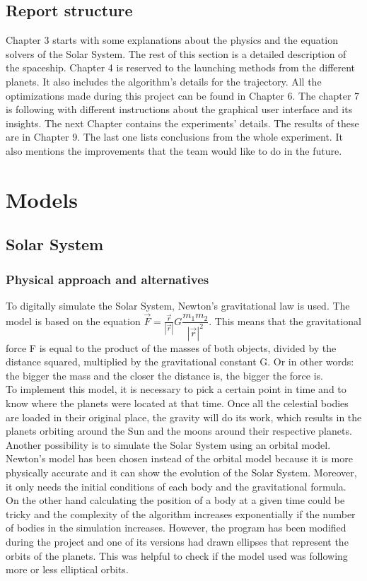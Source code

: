\documentclass[10pt,a4paper]{article}
\begin{document}
	
	
	\subsection{Report structure}
	Chapter 3 starts with some explanations about the physics and the equation solvers of the Solar System. The rest of this section is a detailed description of the spaceship. Chapter 4 is reserved to the launching methods from the different planets. It also includes the algorithm's details for the trajectory. All the optimizations made during this project can be found in Chapter 6. The chapter 7 is following with different instructions about the graphical user interface and its insights. The next Chapter contains the experiments' details. The results of these are in Chapter 9. The last one lists conclusions from the whole experiment. It also mentions the improvements that the team would like to do in the future.
	
	
	\section{Models}
	
	\subsection{Solar System}
	\subsubsection{Physical approach and alternatives}
	To digitally simulate the Solar System, Newton's gravitational law is used. The model is based on the equation $\vec{F} = \frac{\vec{r}}{|\vec{r}|} G \dfrac{m_1 m_2}{|\vec{r}|^2} $. This means that the gravitational force F is equal to the product of the masses of both objects, divided by the distance squared, multiplied by the gravitational constant G. Or in other words: the bigger the mass and the closer the distance is, the bigger the force is.\\
	To implement this model, it is necessary to pick a certain point in time and  to know where the planets were located at that time. Once all the celestial bodies are loaded in their original place, the gravity will do its work, which results in the planets orbiting around the Sun and the moons around their respective planets.\\
	
	Another possibility is to simulate the Solar System using an orbital model. Newton's model has been chosen instead of the orbital model because it is more physically accurate and it can show the evolution of the Solar System. Moreover, it only needs the initial conditions of each body and the gravitational formula. On the other hand calculating the position of a body at a given time could be tricky and the complexity of the algorithm increases exponentially if the number of bodies in the simulation increases.
	However, the program has been modified during the project and one of its versions had drawn ellipses that represent the orbits of the planets. This was helpful to check if the model used was following more or less elliptical orbits.\\
	
\end{document}
